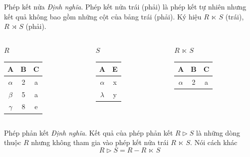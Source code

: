 \documentclass[11pt]{beamer}
\begin{document}
  \begin{frame}{Phép kết nửa}
    \textit{Định nghĩa}. Phép kết nửa trái (phải) là phép kết tự nhiên nhưng kết quả không bao gồm
    những cột của bảng trái (phải). Ký hiệu $R~⋉~S$ (trái), $R~⋊~S$ (phải).
  \end{frame}
  \begin{frame}
    \begin{columns}[T]
      \begin{column}{0.3\textwidth}
        \centering $R$
        \medskip \\
        \begin{tabular}{|c|c|c|}
          \hline
          \textbf{A} & \textbf{B} & \textbf{C}  \\[0.5ex] \hline\hline
          $\alpha$ & 2 & a\\ \hline
          $\beta$ & 5 & a\\ \hline
          $\gamma$ & 8 & e\\ \hline
        \end{tabular}
      \end{column}
      \begin{column}{0.3\textwidth}
        \centering $S$
        \medskip \\
        \begin{tabular}{|c|c|}
          \hline
          \textbf{A} & \textbf{E} \\[0.5ex] \hline\hline
          $\alpha$ & x\\ \hline
          $\lambda$ & y\\ \hline
        \end{tabular}
      \end{column}
      \begin{column}{0.3\textwidth}
        \centering $R~⋉~S$
        \medskip \\
        \begin{tabular}{|c|c|c|}
          \hline
          \textbf{A} & \textbf{B} & \textbf{C}\\[0.5ex] \hline\hline
          $\alpha$ & 2 & a \\ \hline
        \end{tabular}
      \end{column}
    \end{columns}
  \end{frame}
  \begin{frame}{Phép phản kết}
    \textit{Định nghĩa}. Kết quả của phép phản kết $R \rhd S$ là những dòng thuộc $R$ nhưng không tham gia
    vào phép kết nửa trái $R~⋉~S$. Nói cách khác
    $$
    R \rhd S = R - R~⋉~S
    $$
  \end{frame}
\end{document}
